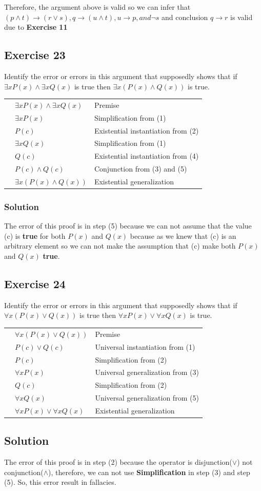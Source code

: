 \documentclass{article}
\newcounter{rown}
\newcounter{rownn}
\newcommand{\row}[2]{\stepcounter{rown}\arabic{rown} & #1 & #2 \\}
\newcommand{\roww}[2]{\stepcounter{rownn}\arabic{rownn} & #1 & #2 \\}
\begin{document}
Therefore, the argument above is valid so we can infer that  $(p \land t) \to(r \lor s), q \to (u \land t), u \to p, and \lnot s$ and conclusion $q \to r$ is valid due to \textbf{Exercise 11}
\subsection*{Exercise 23}
Identify the error or errors in this argument that supposedly shows that if $\exists xP(x) \land \exists xQ(x)$ is true then $\exists x(P(x) \land Q(x))$ is true.\\

\begin{tabular}{r l l}
    \row{$\exists xP(x) \land \exists xQ(x)$}{Premise}
    \row{$\exists xP(x)$}{Simplification from (1)}
    \row{$P(c)$}{Existential instantiation from (2)}
    \row{$\exists xQ(x)$}{Simplification from (1)}
    \row{$Q(c)$}{Existential instantiation from (4)}
    \row{$P(c) \land Q(c)$}{Conjunction from (3) and (5)}
    \row{$\exists x(P(x) \land Q(x))$}{Existential generalization}
\end{tabular}
\subsubsection*{Solution}
The error of this proof is in step (5) because we can not assume that the value (c) is \textbf{true} for both $P(x)$ and $Q(x)$ because as we knew that (c) is an arbitrary element so we can not make the assumption that (c) make both $P(x)$ and $Q(x)$ \textbf{true}.
\subsection*{Exercise 24}
Identify the error or errors in this argument that supposedly shows that if $\forall x(P(x) \lor Q(x))$ is true then $\forall xP(x) \lor \forall xQ(x)$ is true.\\

\begin{tabular}{r l l}
    \roww{$\forall x(P(x) \lor Q(x))$}{Premise}
    \roww{$P(c) \lor Q(c)$}{ Universal instantiation from (1)}
    \roww{$P(c)$}{Simplification from (2)}
    \roww{$\forall xP(x)$}{Universal generalization from (3)}
    \roww{$Q(c)$}{Simplification from (2)}
    \roww{$\forall xQ(x)$}{Universal generalization from (5)}
    \roww{$\forall xP(x) \lor \forall xQ(x)$}{Existential generalization}
\end{tabular}
\subsection*{Solution}
The error of this proof is in step (2) because the operator is disjunction($\lor$) not conjunction($\land$), therefore, we can not use \textbf{Simplification} in step (3) and step (5). So, this error result in fallacies.
\end{document}
